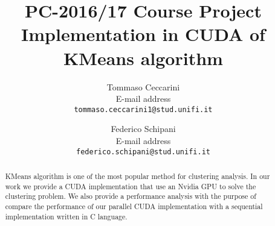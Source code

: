 \documentclass[10pt,twocolumn,letterpaper]{article}
\begin{document}
\title{PC-2016/17 Course Project \\
Implementation in CUDA of KMeans algorithm}

\author{Tommaso Ceccarini \\
E-mail address\\
{\tt\small tommaso.ceccarini1@stud.unifi.it}
\and
Federico Schipani\\
E-mail address\\
{\tt\small federico.schipani@stud.unifi.it}
}

\maketitle
\thispagestyle{empty}

\begin{abstract}
   KMeans algorithm is one of the most popular method for clustering analysis.
   In our work we provide a CUDA implementation that use an Nvidia GPU to solve the clustering problem.
   We also provide a performance analysis with the purpose of compare the performance of our parallel CUDA implementation with a sequential implementation written in C language.
\end{abstract}

\end{document}
